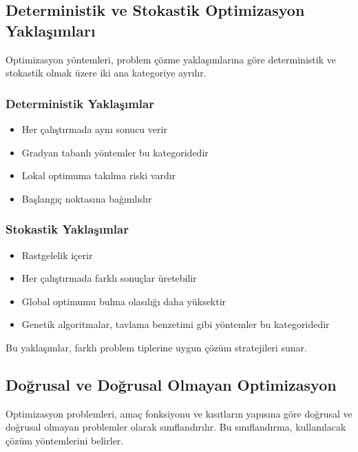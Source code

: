 \subsection{Deterministik ve Stokastik Optimizasyon Yaklaşımları}
Optimizasyon yöntemleri, problem çözme yaklaşımlarına göre deterministik  ve stokastik  olmak üzere iki ana kategoriye ayrılır. 

\subsubsection{Deterministik Yaklaşımlar}
\begin{itemize}
    \item Her çalıştırmada aynı sonucu verir
    \item Gradyan tabanlı yöntemler bu kategoridedir
    \item Lokal optimuma takılma riski vardır
    \item Başlangıç noktasına bağımlıdır
\end{itemize}

\subsubsection{Stokastik Yaklaşımlar}
\begin{itemize}
    \item Rastgelelik içerir
    \item Her çalıştırmada farklı sonuçlar üretebilir
    \item Global optimumu bulma olasılığı daha yüksektir
    \item Genetik algoritmalar, tavlama benzetimi gibi yöntemler bu kategoridedir
\end{itemize}

Bu yaklaşımlar, farklı problem tiplerine uygun çözüm stratejileri sunar. 

\subsection{Doğrusal ve Doğrusal Olmayan Optimizasyon}
Optimizasyon problemleri, amaç fonksiyonu ve kısıtların yapısına göre doğrusal ve doğrusal olmayan problemler olarak sınıflandırılır. Bu sınıflandırma, kullanılacak çözüm yöntemlerini belirler.

